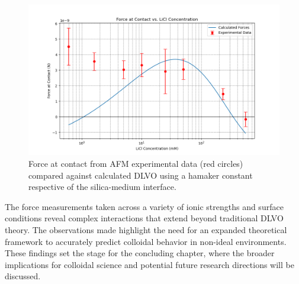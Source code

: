 \begin{figure}[h!]
\centering
\includegraphics[width=\textwidth]{chapter8/Calculated/ham_eff.png}
\caption{Force at contact from AFM experimental data (red circles) compared against calculated DLVO using a hamaker constant respective of the silica-medium interface.}
\label{fig:calc3}
\end{figure}

The force measurements taken across a variety of ionic strengths and surface conditions reveal complex interactions that extend beyond traditional DLVO theory. The observations made highlight the need for an expanded theoretical framework to accurately predict colloidal behavior in non-ideal environments. These findings set the stage for the concluding chapter, where the broader implications for colloidal science and potential future research directions will be discussed.